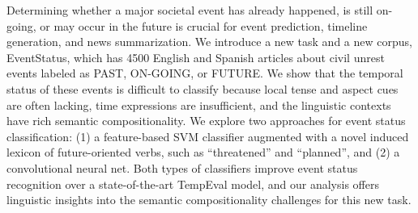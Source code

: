 Determining whether a major societal event has already happened, is still on-going, or may occur in the future is crucial for event prediction, timeline generation, and news summarization. We introduce a new task and a new corpus, EventStatus, which has 4500 English and Spanish articles about civil unrest events labeled as PAST, ON-GOING, or FUTURE. We show that the temporal status of these events is difficult to classify because local tense and aspect cues are often lacking, time expressions are insufficient, and the linguistic contexts have rich semantic compositionality. We explore two approaches for event status classification: (1) a feature-based SVM classifier augmented with a novel induced lexicon of future-oriented verbs, such as ``threatened'' and ``planned'', and (2) a convolutional neural net. Both types of classifiers improve event status recognition over a state-of-the-art TempEval model, and our analysis offers linguistic insights into the semantic compositionality challenges for this new task.
